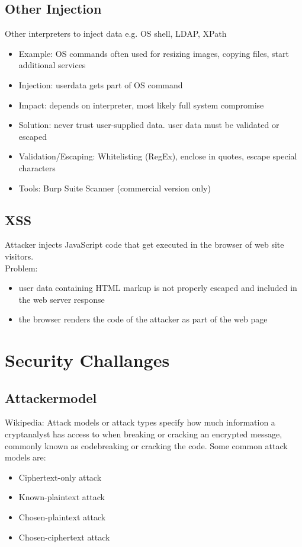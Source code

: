 \documentclass[a4paper, 12pt]{article}
\begin{document}
\subsection{Other Injection}
Other interpreters to inject data e.g. OS shell, LDAP, XPath \\
\begin{itemize}
\item Example: OS commands often used for resizing images, copying files, start additional services
\item Injection: userdata gets part of OS command
\item Impact: depends on interpreter, most likely full system compromise
\item Solution: never trust user-supplied data. user data must be validated or escaped
\item Validation/Escaping: Whitelisting (RegEx), enclose in quotes, escape special characters
\item Tools: Burp Suite Scanner (commercial version only)
\end{itemize}

\subsection{XSS}
Attacker injects JavaScript code that get executed in the browser of web site visitors.\\

Problem:
\begin{itemize}
\item user data containing HTML markup is not properly escaped and included in the web server response
\item the browser renders the code of the attacker as part of the web page
\end{itemize}

\section{Security Challanges}
\subsection{Attackermodel}
Wikipedia: Attack models or attack types specify how much information a cryptanalyst has access to when breaking or cracking an encrypted message, commonly known as codebreaking or cracking the code. 
\large Some common attack models are:
\begin{itemize}
	\item Ciphertext-only attack
	\item Known-plaintext attack
	\item Chosen-plaintext attack
	\item Chosen-ciphertext attack
\end{itemize}
\end{document}
